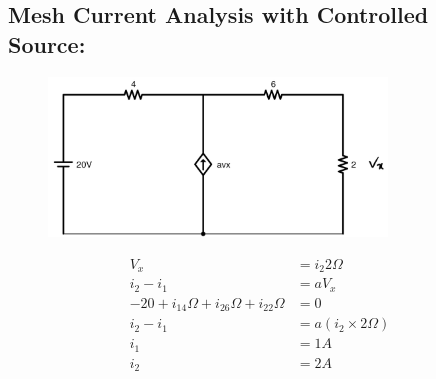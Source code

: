 \documentclass[a4paper,12]{article}
\begin{document}
\subsection{Mesh Current Analysis with Controlled Source:}
\begin{figure}[H]
    \centering
    \includegraphics[width=90mm]{Image/11.jpg}
\end{figure}
\begin{align}
    V_x &=i_2 2\Omega\\
    i_2-i_1 &=aV_x\\
    -20+i_14\Omega+i_26\Omega+i_22\Omega &=0\\
    i_2-i_1 &=a(i_2\times 2\Omega)\\
    i_1 &=1A\\
    i_2 &=2A
\end{align}
\end{document}

